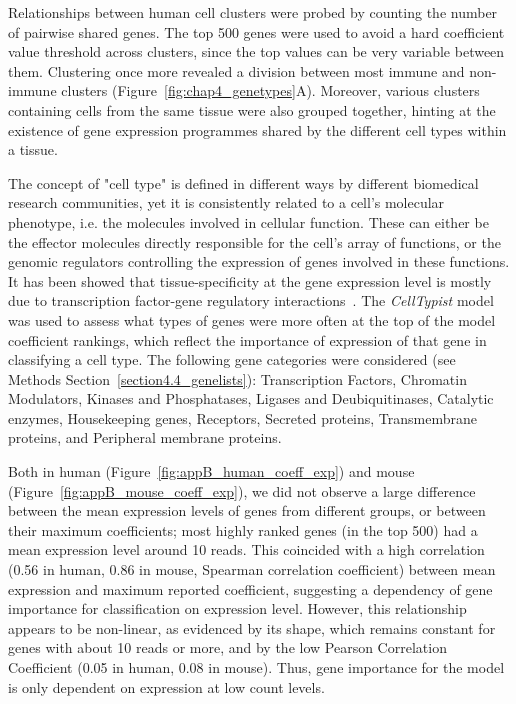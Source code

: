 Relationships between human cell clusters were probed by counting the number of pairwise shared genes. The top 500 genes were used to avoid a hard coefficient value threshold across clusters, since the top values can be very variable between them. Clustering once more revealed a division between most immune and non-immune clusters (Figure~\ref{fig:chap4_genetypes}A). Moreover, various clusters containing cells from the same tissue were also grouped together, hinting at the existence of gene expression programmes shared by the different cell types within a tissue. 

The concept of "cell type" is defined in different ways by different biomedical research communities, yet it is consistently related to a cell's molecular phenotype, i.e. the molecules involved in cellular function. These can either be the effector molecules directly responsible for the cell's array of functions, or the genomic regulators controlling the expression of genes involved in these functions. It has been showed that tissue-specificity at the gene expression level is mostly due to transcription factor-gene regulatory interactions~\citep{sonawane_understanding_2017}. The \textit{CellTypist} model was used to assess what types of genes were more often at the top of the model coefficient rankings, which reflect the importance of expression of that gene in classifying a cell type. The following gene categories were considered (see Methods Section~\ref{section4.4_genelists}): Transcription Factors, Chromatin Modulators, Kinases and Phosphatases, Ligases and Deubiquitinases, Catalytic enzymes, Housekeeping genes, Receptors, Secreted proteins, Transmembrane proteins, and Peripheral membrane proteins. 

Both in human (Figure~\ref{fig:appB_human_coeff_exp}) and mouse (Figure~\ref{fig:appB_mouse_coeff_exp}), we did not observe a large difference between the mean expression levels of genes from different groups, or between their maximum coefficients; most highly ranked genes (in the top 500) had a mean expression level around 10 reads. This coincided with a high correlation (0.56 in human, 0.86 in mouse, Spearman correlation coefficient) between mean expression and maximum reported coefficient, suggesting a dependency of gene importance for classification on expression level. However, this relationship appears to be non-linear, as evidenced by its shape, which remains constant for genes with about 10 reads or more, and by the low Pearson Correlation Coefficient (0.05 in human, 0.08 in mouse). Thus, gene importance for the model is only dependent on expression at low count levels.

